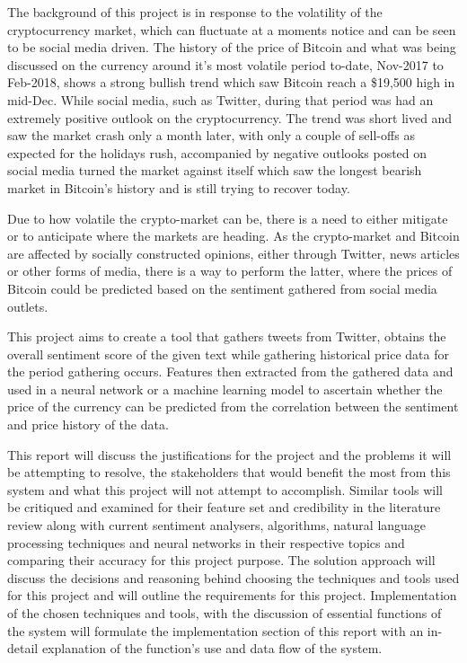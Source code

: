 \documentclass[oneside, 12pt]{article}
\begin{document}
	The background of this project is in response to the volatility of the cryptocurrency market, which can fluctuate at a moments notice and can be seen to be social media driven. The history of the price of Bitcoin and what was being discussed on the currency around it's most volatile period to-date, Nov-2017 to Feb-2018, shows a strong bullish trend which saw Bitcoin reach a \$19,500 high in mid-Dec. While social media, such as Twitter, during that period was had an extremely positive outlook on the cryptocurrency. The trend was short lived and saw the market crash only a month later, with only a couple of sell-offs as expected for the holidays rush, accompanied by negative outlooks posted on social media turned the market against itself which saw the longest bearish market in Bitcoin's history and is still trying to recover today.
	
	Due to how volatile the crypto-market can be, there is a need to either mitigate or to anticipate where the markets are heading. As the crypto-market and Bitcoin are affected by socially constructed opinions, either through Twitter, news articles or other forms of media, there is a way to perform the latter, where the prices of Bitcoin could be predicted based on the sentiment gathered from social media outlets.
	
	This project aims to create a tool that gathers tweets from Twitter, obtains the overall sentiment score of the given text while gathering historical price data for the period gathering occurs. Features then extracted from the gathered data and used in a neural network or a machine learning model to ascertain whether the price of the currency can be predicted from the correlation between the sentiment and price history of the data.
	
	This report will discuss the justifications for the project and the problems it will be attempting to resolve, the stakeholders that would benefit the most from this system and what this project will not attempt to accomplish. Similar tools will be critiqued and examined for their feature set and credibility in the literature review along with current sentiment analysers, algorithms, natural language processing techniques and neural networks in their respective topics and comparing their accuracy for this project purpose. 
	The solution approach will discuss the decisions and reasoning behind choosing the techniques and tools used for this project and will outline the requirements for this project.
	Implementation of the chosen techniques and tools, with the discussion of essential functions of the system will formulate the implementation section of this report with an in-detail explanation of the function's use and data flow of the system.
	
\end{document}
